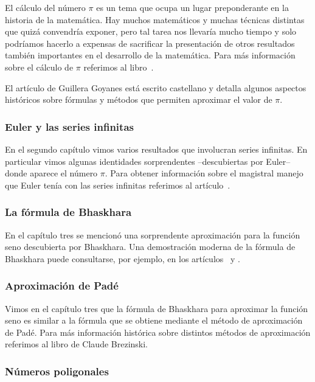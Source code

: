 El cálculo del número $\pi$ es un tema que ocupa un lugar preponderante en la
historia de la matemática. Hay muchos matemáticos y muchas técnicas distintas
que quizá convendría exponer, pero tal tarea nos llevaría mucho tiempo y solo
podríamos hacerlo a expensas de sacrificar la presentación de otros resultados
también importantes en el desarrollo de la matemática. Para más información
sobre el cálculo de $\pi$ referimos al libro~\cite{MR0449960}. 

El artículo 
\cite{zbMATH05356362} de 
Guillera Goyanes está escrito castellano y 
detalla algunos aspectos históricos sobre fórmulas y métodos que
permiten aproximar el valor de $\pi$. 

\subsubsection*{Euler y las series infinitas}

En el segundo capítulo vimos varios resultados que involucran series infinitas. En particular 
vimos algunas identidades sorprendentes --descubiertas por Euler-- 
donde aparece el número $\pi$. Para obtener información 
sobre el magistral manejo que Euler tenía con las series
infinitas referimos al artículo~\cite{MR2338363}.

\subsubsection*{La fórmula de Bhaskhara}

En el capítulo tres se mencionó una sorprendente aproximación 
para la función seno descubierta por Bhaskhara. 
Una demostración moderna de la fórmula de Bhaskhara puede
consultarse, por ejemplo, en los artículos~\cite{MR1108101} y \cite{MR2793182}.

\subsubsection*{Aproximación de Pad\'e}

Vimos en el capítulo tres que la fórmula de Bhaskhara 
para aproximar la función seno es similar a la fórmula que
se obtiene mediante el método de aproximación de Pad\'e. Para
más información histórica sobre distintos m\'etodos 
de aproximación referimos al libro \cite{MR1083352} 
de Claude Brezinski. 

\subsubsection*{Números poligonales}

